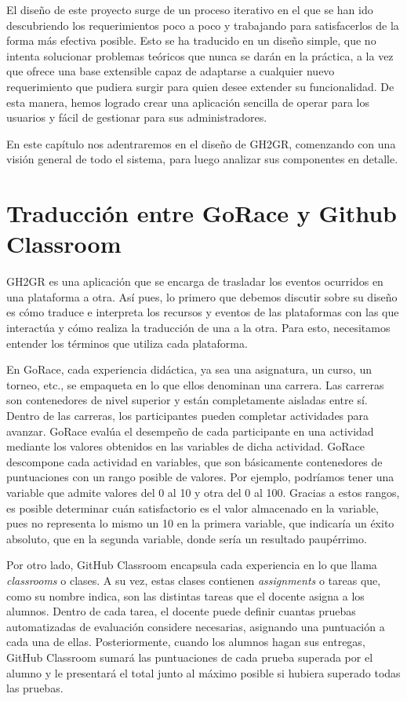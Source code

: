 El diseño de este proyecto surge de un proceso iterativo en el que se han ido descubriendo los requerimientos poco a poco y trabajando para satisfacerlos de la forma más efectiva posible. Esto se ha traducido en un diseño simple, que no intenta solucionar problemas teóricos que nunca se darán en la práctica, a la vez que ofrece una base extensible capaz de adaptarse a cualquier nuevo requerimiento que pudiera surgir para quien desee extender su funcionalidad. De esta manera, hemos logrado crear una aplicación sencilla de operar para los usuarios y fácil de gestionar para sus administradores.

En este capítulo nos adentraremos en el diseño de GH2GR, comenzando con una visión general de todo el sistema, para luego analizar sus componentes en detalle.
\section{Traducción entre GoRace y Github Classroom} \label{title:mapping-gorace-gh}
GH2GR es una aplicación que se encarga de trasladar los eventos ocurridos en una plataforma a otra. Así pues, lo primero que debemos discutir sobre su diseño es cómo traduce e interpreta los recursos y eventos de las plataformas con las que interactúa y cómo realiza la traducción de una a la otra. Para esto, necesitamos entender los términos que utiliza cada plataforma.

En GoRace, cada experiencia didáctica, ya sea una asignatura, un curso, un torneo, etc., se empaqueta en lo que ellos denominan una carrera. Las carreras son contenedores de nivel superior y están completamente aisladas entre sí. Dentro de las carreras, los participantes pueden completar actividades para avanzar. GoRace evalúa el desempeño de cada participante en una actividad mediante los valores obtenidos en las variables de dicha actividad. GoRace descompone cada actividad en variables, que son básicamente contenedores de puntuaciones con un rango posible de valores. Por ejemplo, podríamos tener una variable que admite valores del 0 al 10 y otra del 0 al 100. Gracias a estos rangos, es posible determinar cuán satisfactorio es el valor almacenado en la variable, pues no representa lo mismo un 10 en la primera variable, que indicaría un éxito absoluto, que en la segunda variable, donde sería un resultado paupérrimo.

Por otro lado, GitHub Classroom encapsula cada experiencia en lo que llama \textit{classrooms} o clases. A su vez, estas clases contienen \textit{assignments} o tareas que, como su nombre indica, son las distintas tareas que el docente asigna a los alumnos. Dentro de cada tarea, el docente puede definir cuantas pruebas automatizadas de evaluación considere necesarias, asignando una puntuación a cada una de ellas. Posteriormente, cuando los alumnos hagan sus entregas, GitHub Classroom sumará las puntuaciones de cada prueba superada por el alumno y le presentará el total junto al máximo posible si hubiera superado todas las pruebas.

